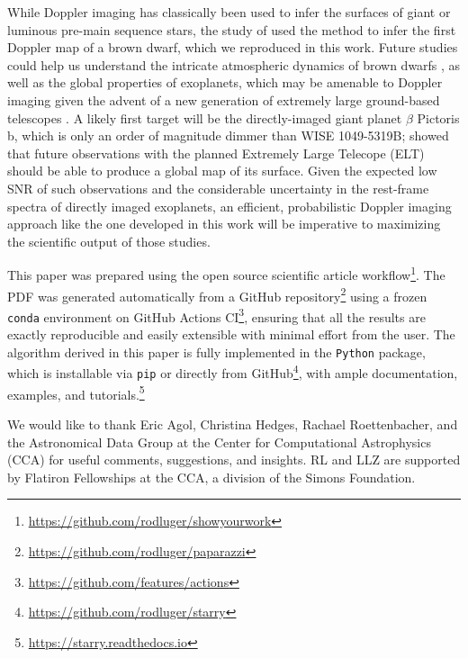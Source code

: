 \documentclass[modern]{aastex631}
\begin{document}
While Doppler imaging has classically been used to infer the surfaces of giant or luminous pre-main sequence stars, the study of \citet{Crossfield2014} used the method to infer the first Doppler map of a brown dwarf, which we reproduced in this work.
Future studies could help us understand the intricate atmospheric dynamics of brown dwarfs \citep{Tan2021a,Tan2021b}, as well as the global properties of exoplanets, which may be amenable to Doppler imaging given the advent of a new generation of extremely large ground-based telescopes \citep{Crossfield2014b}.
A likely first target will be the directly-imaged giant planet $\beta$ Pictoris b, which is only an order of magnitude dimmer than WISE 1049-5319B; \citet{Snellen2014} showed that future observations with the planned Extremely Large Telecope (ELT) should be able to produce a global map of its surface.
Given the expected low SNR of such observations and the considerable uncertainty in the rest-frame spectra of directly imaged exoplanets, an efficient, probabilistic Doppler imaging approach like the one developed in this work will be imperative to maximizing the scientific output of those studies.

\vspace{1em}

This paper was prepared using the \showyourwork open source scientific article workflow\footnote{\url{https://github.com/rodluger/showyourwork}}.
The PDF was generated automatically from a GitHub repository\footnote{\url{https://github.com/rodluger/paparazzi}} using a frozen \texttt{conda} environment on GitHub Actions CI\footnote{\url{https://github.com/features/actions}}, ensuring that all the results are exactly reproducible and easily extensible with minimal effort from the user.
The algorithm derived in this paper is fully implemented in the \starry \texttt{Python} package, which is installable via \texttt{pip} or directly from GitHub\footnote{\url{https://github.com/rodluger/starry}}, with ample documentation, examples, and tutorials.\footnote{\url{https://starry.readthedocs.io}}

\vspace{1em}

We would like to thank Eric Agol, Christina Hedges, Rachael Roettenbacher, and the Astronomical Data Group at the Center for Computational Astrophysics (CCA) for useful comments, suggestions, and insights.
RL and LLZ are supported by Flatiron Fellowships at the CCA, a division of the Simons Foundation.

%
%
%
%
\clearpage
\appendix
%
%
%
%
\end{document}
